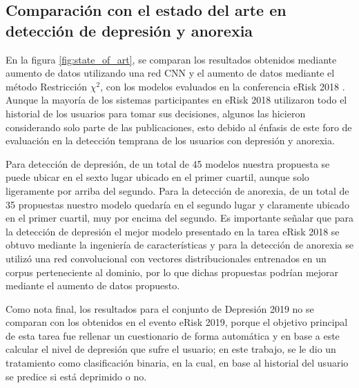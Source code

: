 





\newpage

\subsection{Comparación con el estado del arte en detección de depresión y anorexia}
En la figura \ref{fig:state_of_art}, se comparan los resultados obtenidos mediante aumento de datos utilizando una red CNN y el aumento de datos mediante el método Restricción $\chi^2$, con los modelos evaluados en la conferencia eRisk 2018 \citep{Losada2018}. Aunque la mayoría de los sistemas participantes en eRisk 2018 utilizaron todo el historial de los usuarios para tomar sus decisiones, algunos las hicieron considerando solo parte de las publicaciones, esto debido al énfasis de este foro de evaluación en la detección temprana de los usuarios con depresión y anorexia.

Para detección de depresión, de un total de 45 modelos nuestra propuesta se puede ubicar en el sexto lugar ubicado en el primer cuartil, aunque solo ligeramente por arriba del segundo. Para la detección de anorexia, de un total de 35 propuestas nuestro modelo quedaría en el segundo lugar y claramente ubicado en el primer cuartil, muy por encima del segundo. Es importante señalar que para la detección de depresión el mejor modelo presentado en la tarea eRisk 2018 se obtuvo mediante la ingeniería de características y para la detección de anorexia se utilizó una red convolucional con vectores distribucionales entrenados en un corpus perteneciente al dominio, por lo que dichas propuestas podrían mejorar mediante el aumento de datos propuesto. 

Como nota final, los resultados para el conjunto de Depresión 2019 no se comparan con los obtenidos en el evento eRisk 2019, porque el objetivo principal de esta tarea fue rellenar un cuestionario de forma automática y en base a este calcular el nivel de depresión que sufre el usuario; en este trabajo, se le dio un tratamiento como clasificación binaria, en la cual, en base al historial del usuario se predice si está deprimido o no.








